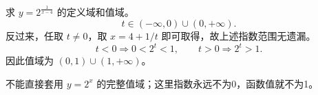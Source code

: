 \begin{frame}[t,label=A13a3]
  求 $y=2^{\frac1{x-4}}$ 的定义域和值域。
  \pause
  \[
    t\in(-\infty,0)\cup(0,+\infty).
  \]
  反过来，任取 $t\ne0$，取 $x=4+1/t$ 即可取得，故上述指数范围无遗漏。
  \[
    t<0\Rightarrow 0<2^t<1,\qquad
    t>0\Rightarrow 2^t>1.
  \]
  因此值域为 $\boxed{(0,1)\cup(1,+\infty)}$。
  \par 不能直接套用 $y=2^x$ 的完整值域；这里指数永远不为0，函数值就不为1。
\end{frame}
